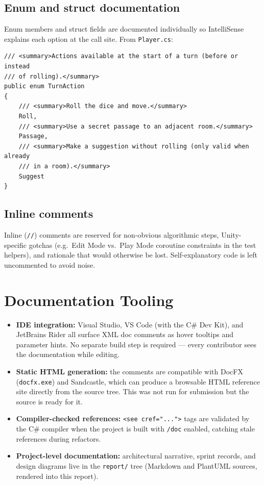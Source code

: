 \subsection*{Enum and struct documentation}

Enum members and struct fields are documented individually so IntelliSense
explains each option at the call site. From \texttt{Player.cs}:

\begin{verbatim}
/// <summary>Actions available at the start of a turn (before or instead
/// of rolling).</summary>
public enum TurnAction
{
    /// <summary>Roll the dice and move.</summary>
    Roll,
    /// <summary>Use a secret passage to an adjacent room.</summary>
    Passage,
    /// <summary>Make a suggestion without rolling (only valid when already
    /// in a room).</summary>
    Suggest
}
\end{verbatim}

\subsection*{Inline comments}

Inline (\texttt{//}) comments are reserved for non-obvious algorithmic steps,
Unity-specific gotchas (e.g.\ Edit Mode vs.\ Play Mode coroutine constraints in
the test helpers), and rationale that would otherwise be lost. Self-explanatory
code is left uncommented to avoid noise.

\section{Documentation Tooling}

\begin{itemize}
    \item \textbf{IDE integration:} Visual Studio, VS Code (with the C\# Dev
    Kit), and JetBrains Rider all surface XML doc comments as hover tooltips
    and parameter hints. No separate build step is required --- every
    contributor sees the documentation while editing.
    \item \textbf{Static HTML generation:} the comments are compatible with
    DocFX (\texttt{docfx.exe}) and Sandcastle, which can produce a browsable
    HTML reference site directly from the source tree. This was not run for
    submission but the source is ready for it.
    \item \textbf{Compiler-checked references:} \texttt{<see cref="...">} tags
    are validated by the C\# compiler when the project is built with
    \texttt{/doc} enabled, catching stale references during refactors.
    \item \textbf{Project-level documentation:} architectural narrative,
    sprint records, and design diagrams live in the \texttt{report/} tree
    (Markdown and PlantUML sources, rendered into this report).
\end{itemize}

